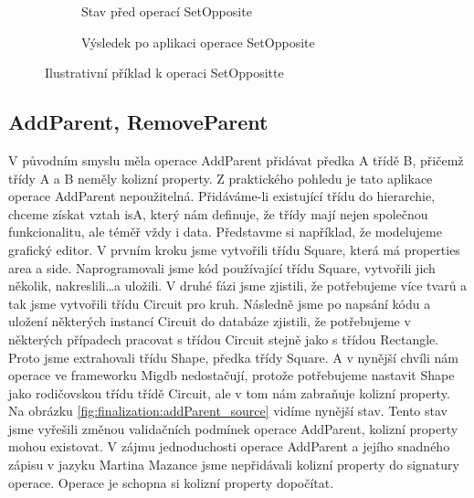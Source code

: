 \documentclass[11pt,twoside,a4paper]{book}
\begin{document}
\begin{figure}
\centering
\begin{subfigure}[b]{0.5\textwidth}
\caption{Stav před operací SetOpposite}
\label{fig:finalization:setOpposite_source}
\end{subfigure}
%
\begin{subfigure}[b]{0.5\textwidth}
\caption{Výsledek po aplikaci operace SetOpposite}
\label{fig:finalization:setOpposite_target}
\end{subfigure}
\caption{Ilustrativní příklad k operaci SetOppositte}
\end{figure}
\FloatBarrier

\subsection{AddParent, RemoveParent}
V původním smyslu měla operace AddParent přidávat předka A třídě B, přičemž
třídy A a B neměly kolizní property. Z praktického pohledu je tato aplikace
operace AddParent nepoužitelná. Přidáváme-li existující třídu do hierarchie,
chceme získat vztah isA, který nám definuje, že třídy mají nejen společnou
funkcionalitu, ale téměř vždy i data. Představme si například, že modelujeme
grafický editor. V prvním kroku jsme vytvořili třídu Square, která má properties
area a side. Naprogramovali jsme kód používající třídu Square, vytvořili jich
několik, nakreslili\ldots a uložili. V druhé fázi jsme zjistili, že potřebujeme
více tvarů a tak jsme vytvořili třídu Circuit pro kruh. Následně jsme po napsání
kódu a uložení některých instancí Circuit do databáze zjistili, že
potřebujeme v některých případech pracovat s třídou Circuit stejně
jako s třídou Rectangle. Proto jsme extrahovali třídu Shape, předka třídy
Square. A v nynější chvíli nám operace ve frameworku Migdb nedostačují,
protože potřebujeme nastavit Shape jako rodičovskou třídu třídě Circuit, ale v
tom nám zabraňuje kolizní property. Na obrázku
\ref{fig:finalization:addParent_source} vidíme nynější stav. Tento stav jsme
vyřešili změnou validačních podmínek operace AddParent, kolizní property mohou
existovat. V zájmu jednoduchosti operace AddParent a jejího snadného zápisu v
jazyku Martina Mazance jsme nepřidávali kolizní property do signatury operace.
Operace je schopna si kolizní property dopočítat. 
\end{document}
